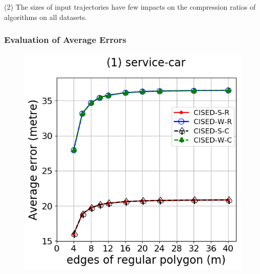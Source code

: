 {\ni(2) The sizes of input trajectories have few impacts on the compression ratios of \lsa algorithms on all datasets.





\subsubsection{Evaluation of Average Errors}



\begin{figure}[tb!]
	\centering
	\includegraphics[scale = 0.2900]{Figures/Exp-M-e-60-error-service.png}\hspace{1ex}

\end{figure}}
